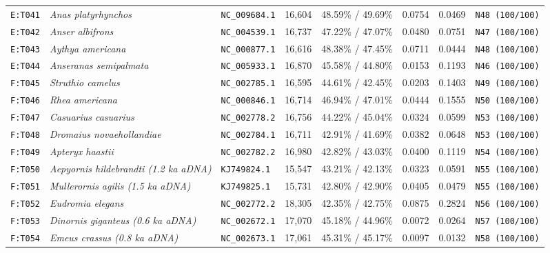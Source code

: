 \documentclass[10pt,letterpaper]{article}
\begin{document}
\begin{longtable}{llllllll}
\texttt{E:T041} & \textit{Anas platyrhynchos} & \texttt{NC\_009684.1} & 16,604 & 48.59\% / 49.69\% & 0.0754 & 0.0469 & \texttt{N48 (100/100)} \\
\texttt{E:T042} & \textit{Anser albifrons} & \texttt{NC\_004539.1} & 16,737 & 47.22\% / 47.07\% & 0.0480 & 0.0751 & \texttt{N47 (100/100)} \\
\texttt{E:T043} & \textit{Aythya americana} & \texttt{NC\_000877.1} & 16,616 & 48.38\% / 47.45\% & 0.0711 & 0.0444 & \texttt{N48 (100/100)} \\
\texttt{E:T044} & \textit{Anseranas semipalmata} & \texttt{NC\_005933.1} & 16,870 & 45.58\% / 44.80\% & 0.0153 & 0.1193 & \texttt{N46 (100/100)} \\
\texttt{F:T045} & \textit{Struthio camelus} & \texttt{NC\_002785.1} & 16,595 & 44.61\% / 42.45\% & 0.0203 & 0.1403 & \texttt{N49 (100/100)} \\
\texttt{F:T046} & \textit{Rhea americana} & \texttt{NC\_000846.1} & 16,714 & 46.94\% / 47.01\% & 0.0444 & 0.1555 & \texttt{N50 (100/100)} \\
\texttt{F:T047} & \textit{Casuarius casuarius} & \texttt{NC\_002778.2} & 16,756 & 44.22\% / 45.04\% & 0.0324 & 0.0599 & \texttt{N53 (100/100)} \\
\texttt{F:T048} & \textit{Dromaius novaehollandiae} & \texttt{NC\_002784.1} & 16,711 & 42.91\% / 41.69\% & 0.0382 & 0.0648 & \texttt{N53 (100/100)} \\
\texttt{F:T049} & \textit{Apteryx haastii} & \texttt{NC\_002782.2} & 16,980 & 42.82\% / 43.03\% & 0.0400 & 0.1119 & \texttt{N54 (100/100)} \\
\texttt{F:T050} & \textit{\textdagger{}Aepyornis hildebrandti (1.2 ka aDNA)} & \texttt{KJ749824.1} & 15,547 & 43.21\% / 42.13\% & 0.0323 & 0.0591 & \texttt{N55 (100/100)} \\
\texttt{F:T051} & \textit{\textdagger{}Mullerornis agilis (1.5 ka aDNA)} & \texttt{KJ749825.1} & 15,731 & 42.80\% / 42.90\% & 0.0405 & 0.0479 & \texttt{N55 (100/100)} \\
\texttt{F:T052} & \textit{Eudromia elegans} & \texttt{NC\_002772.2} & 18,305 & 42.35\% / 42.75\% & 0.0875 & 0.2824 & \texttt{N56 (100/100)} \\
\texttt{F:T053} & \textit{\textdagger{}Dinornis giganteus (0.6 ka aDNA)} & \texttt{NC\_002672.1} & 17,070 & 45.18\% / 44.96\% & 0.0072 & 0.0264 & \texttt{N57 (100/100)} \\
\texttt{F:T054} & \textit{\textdagger{}Emeus crassus (0.8 ka aDNA)} & \texttt{NC\_002673.1} & 17,061 & 45.31\% / 45.17\% & 0.0097 & 0.0132 & \texttt{N58 (100/100)} \\

\end{longtable}
\end{document}
